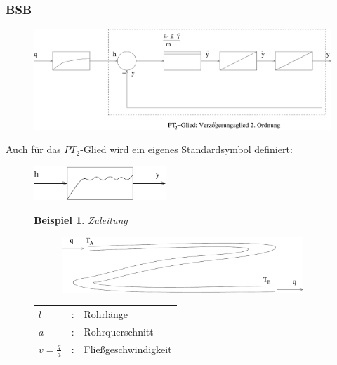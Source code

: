 \documentclass[12pt,a4paper,ngerman]{scrartcl}
\newtheorem{bsp}{Beispiel}[section] %
\begin{document}
\subsubsection*{BSB}

\begin{figure}[H]
  \centering
\includegraphics[width=.8\linewidth]{sysregel_bsb5}  
\end{figure}

Auch für das $PT_2$-Glied wird ein eigenes Standardsymbol definiert:
\begin{figure}[H]
\includegraphics[width=5cm]{sysregel_pt2}
  
\end{figure}

\begin{figure}[H]
\begin{bsp}
Zuleitung
\end{bsp}

\begin{minipage}{.6\linewidth}
\begin{figure}[H]
 \includegraphics[width=.9\linewidth]{sysregel_bsp_5} 
\end{figure}
\end{minipage}
\begin{minipage}{.4\linewidth}
\begin{tabular}{lll}
$l$&:& Rohrlänge\\
$a$&:&Rohrquerschnitt\\
$v=\frac{q}{a}$&:& Fließgeschwindigkeit
\end{tabular}
\end{minipage}
\end{figure}
\end{document}
